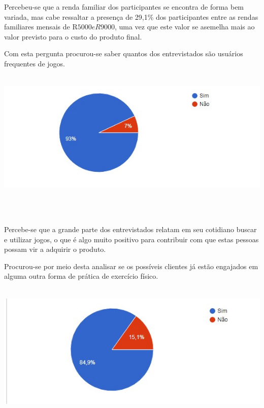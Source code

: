 \begin{apendicesenv}
Percebeu-se que a renda familiar dos participantes se encontra de forma bem variada, mas cabe ressaltar a presença de 29,1\% dos participantes entre as rendas familiares mensais de R$5000 e R$9000, uma vez que este valor se asemelha mais ao valor previsto para o custo do produto final. 
 

Com esta pergunta procurou-se saber quantos dos entrevistados são usuários frequentes de jogos.
\begin{center}
    \includegraphics[scale=0.7]{figuras/jogos}
       \label{jogos}
 \end{center}   

Percebe-se que a grande parte dos entrevistados relatam em seu cotidiano buscar e utilizar jogos, o que é algo muito positivo para contribuir com que estas pessoas possam vir a adquirir o produto. 
 
Procurou-se por meio desta analisar se os possíveis clientes já estão engajados em alguma outra forma de prática de exercício físico. 
                                           \begin{center}
    \includegraphics[scale=0.7]{figuras/atividadefisica}
       \label{atividadefisica}
 \end{center}   
 

\end{apendicesenv}

